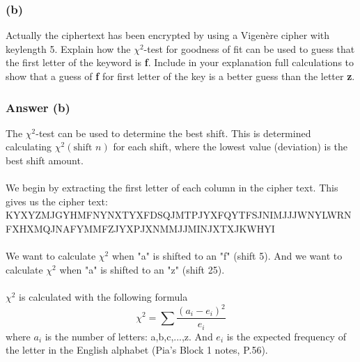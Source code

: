 \documentclass{article}
\begin{document}
	\subsubsection*{(b)}
	Actually the ciphertext has been encrypted by using a Vigenère cipher with
	keylength 5. Explain how the $\chi^2$-test for goodness of fit can be used to guess that
	the first letter of the keyword is \textbf{f}. Include in your explanation full calculations to
	show that a guess of \textbf{f} for first letter of the key is a better guess than the letter \textbf{z}.
	
	\subsubsection*{Answer (b)}
	The $\chi^2$-test can be used to determine the best shift. This is determined calculating $\chi^2(\text{shift } n)$ for each shift, where the lowest value (deviation) is the best shift amount.  
	\\\\
	We begin by extracting the first letter of each column in the cipher text. This gives us the cipher text: 
	KYXYZMJGYHMFNYNXTYXFDSQJMTPJYXFQYTFSJNIMJJJWNYLWRNFXHXMQJNAFYMMFZJYXPJXNMMJJMINJXTXJKWHYI
	\\\\
	We want to calculate $\chi^2$ when "a" is shifted to an "f" (shift 5). And we want to calculate $\chi^2$ when "a" is shifted to an "z" (shift 25). 
	\\\\
	$\chi^2$ is calculated with the following formula
	$$
	\chi^2=\sum\frac{(a_i-e_i)^2}{e_i}
	$$
	where $a_i$ is the number of letters: a,b,c,...,z. And $e_i$ is the expected frequency of the letter in the English alphabet (Pia's Block 1 notes, P.56).
\end{document}
